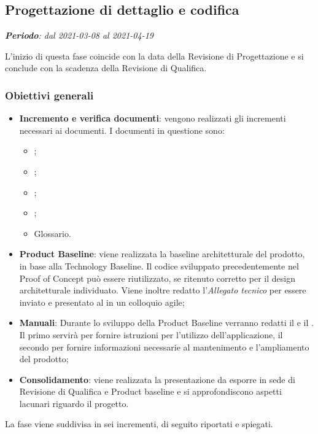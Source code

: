 \subsection{Progettazione di dettaglio e codifica}
\textit{\textbf{Periodo}: dal 2021-03-08 al 2021-04-19}

L'inizio di questa fase coincide con la data della Revisione di Progettazione e si conclude con la scadenza della Revisione di Qualifica.

\subsubsection{Obiettivi generali}

\begin{itemize}
\item \textbf{Incremento e verifica documenti}: vengono realizzati gli incrementi necessari ai documenti. I documenti in questione sono:
\begin{itemize}
\item \NdP{};
\item \AdR{};
\item \PdQ{};
\item \PdP{};
\item Glossario.
\end{itemize}
\item \textbf{Product Baseline}: viene realizzata la baseline architetturale del prodotto, in base alla Technology Baseline. Il codice sviluppato precedentemente nel Proof of Concept può essere riutilizzato, se ritenuto corretto per il design architetturale individuato. Viene inoltre redatto l'\textit{Allegato tecnico} per essere inviato e presentato al \CR{} in un colloquio agile;
\item \textbf{Manuali}: Durante lo sviluppo della Product Baseline verranno redatti il \MU{} e il \MM. Il primo servirà per fornire istruzioni per l'utilizzo dell'applicazione, il secondo per fornire informazioni necessarie al mantenimento e l'ampliamento del prodotto;
\item \textbf{Consolidamento}: viene realizzata la presentazione da esporre in sede di Revisione di Qualifica e Product baseline e si approfondiscono aspetti lacunari riguardo il progetto.
\end{itemize}

La fase viene suddivisa in sei incrementi, di seguito riportati e spiegati.


\newpage

\newpage

\newpage

\newpage

\newpage

\newpage
